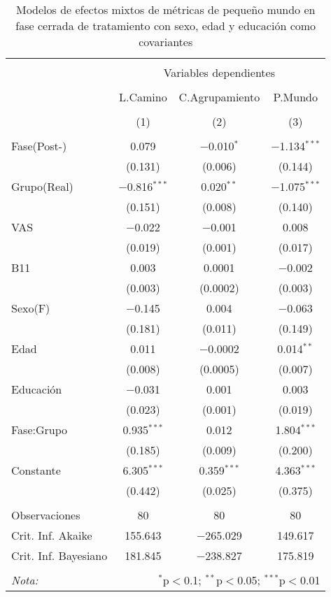 \begin{table}[!htb] \centering
    \small
  \caption{Modelos de efectos mixtos de métricas de pequeño mundo en fase cerrada de tratamiento con sexo, edad y educación como covariantes}
  \label{tab:memT2}
\begin{tabular}{@{\extracolsep{5pt}}lccc}
\\[-1.8ex]\hline
\hline \\[-1.8ex]
 & \multicolumn{3}{c}{Variables dependientes} \\
\cline{2-4}
\\[-1.8ex] & L.Camino & C.Agrupamiento & P.Mundo \\
\\[-1.8ex] & (1) & (2) & (3)\\
\hline \\[-1.8ex]
 Fase(Post-) & 0.079 & $-$0.010$^{*}$ & $-$1.134$^{***}$ \\
  & (0.131) & (0.006) & (0.144) \\
  Grupo(Real) & $-$0.816$^{***}$ & 0.020$^{**}$ & $-$1.075$^{***}$ \\
  & (0.151) & (0.008) & (0.140) \\
  VAS & $-$0.022 & $-$0.001 & 0.008 \\
  & (0.019) & (0.001) & (0.017) \\
  B11 & 0.003 & 0.0001 & $-$0.002 \\
  & (0.003) & (0.0002) & (0.003) \\
  Sexo(F) & $-$0.145 & 0.004 & $-$0.063 \\
  & (0.181) & (0.011) & (0.149) \\
  Edad & 0.011 & $-$0.0002 & 0.014$^{**}$ \\
  & (0.008) & (0.0005) & (0.007) \\
  Educación & $-$0.031 & 0.001 & 0.003 \\
  & (0.023) & (0.001) & (0.019) \\
  Fase:Grupo & 0.935$^{***}$ & 0.012 & 1.804$^{***}$ \\
  & (0.185) & (0.009) & (0.200) \\
  Constante & 6.305$^{***}$ & 0.359$^{***}$ & 4.363$^{***}$ \\
  & (0.442) & (0.025) & (0.375) \\
 \hline \\[-1.8ex]
Observaciones & 80 & 80 & 80 \\
Crit. Inf. Akaike & 155.643 & $-$265.029 & 149.617 \\
Crit. Inf. Bayesiano & 181.845 & $-$238.827 & 175.819 \\
\hline
\hline \\[-1.8ex]
\textit{Nota:}  & \multicolumn{3}{r}{$^{*}$p$<$0.1; $^{**}$p$<$0.05; $^{***}$p$<$0.01} \\
\end{tabular}
\end{table}

